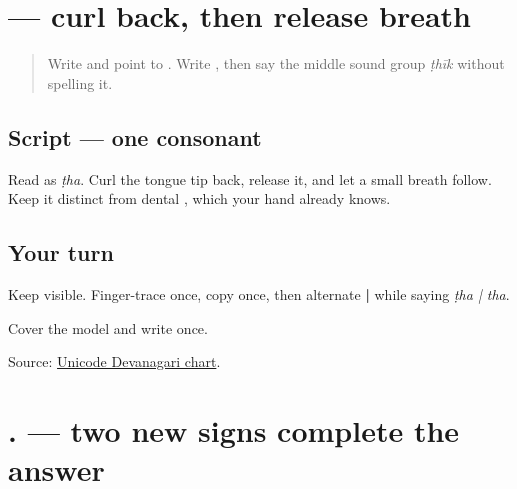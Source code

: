 \section[\texorpdfstring{\mw{ठ} (ṭha)}{ठ (ṭha)}]{ — curl back, then release breath}

\label{lesson:MW-W06-ttha}



\begin{quote}
Write \textbf{} and point to \textbf{}. Write \textbf{}, then say the middle sound group \emph{ṭhīk} without spelling it.
\end{quote}

\subsection*{Script — one consonant}

\begin{quote}
\textbf{}
\end{quote}

Read \textbf{} as \emph{ṭha}. Curl the tongue tip back, release it, and let a small breath follow. Keep it distinct from dental \textbf{}, which your hand already knows.

\subsection*{Your turn}
Keep \textbf{} visible. Finger-trace once, copy once, then alternate \textbf{ | } while saying \emph{ṭha | tha}.

\begin{tcolorbox}[breakable,colback=teal!4,colframe=teal!35!black,title={Before you move on}]
Cover the model and write \textbf{} once.

Source: \href{https://www.unicode.org/charts/PDF/U0900.pdf}{Unicode Devanagari chart}.
\end{tcolorbox}
\section[\texorpdfstring{\mw{हूं} \mw{ठीक} \mw{हूं}. (hū̃ ṭhīk hū̃.)}{हूं ठीक हूं. (hū̃ ṭhīk hū̃.)}]{  . — two new signs complete the answer}

\label{lesson:MW-C06-answer}



